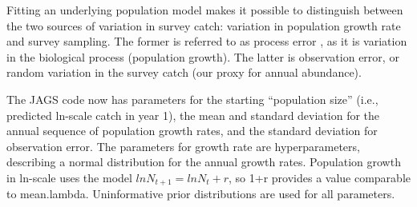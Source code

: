 \documentclass[
]{krantz}
\begin{document}
Fitting an underlying population model makes it possible to distinguish between the two sources of variation in survey catch: variation in population growth rate and survey sampling. The former is referred to as process error \citep{kéry.schaub_2011}, as it is variation in the biological process (population growth). The latter is observation error, or random variation in the survey catch (our proxy for annual abundance).

The JAGS code now has parameters for the starting ``population size'' (i.e., predicted ln-scale catch in year 1), the mean and standard deviation for the annual sequence of population growth rates, and the standard deviation for observation error. The parameters for growth rate are hyperparameters, describing a normal distribution for the annual growth rates. Population growth in ln-scale uses the model \(lnN_{t+1}=lnN_t+r\), so 1+r provides a value comparable to mean.lambda. Uninformative prior distributions are used for all parameters.
\end{document}
